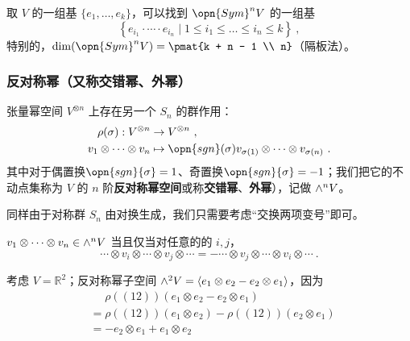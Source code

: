 取 $V$ 的一组基 $\{e_1, \dots, e_k\}$，可以找到 $\opn{Sym}^n V$ 的一组基
\begin{equation}
\left\{ e_{i_1} \cdot \cdots \cdot e_{i_n} \mid 1 \leq i_1 \leq \dots \leq i_n \leq k \right\}~,
\end{equation}
特别的，$\dim(\opn{Sym}^n V) = \pmat{k + n - 1 \\ n}$（隔板法）。

\subsubsection{反对称幂（又称交错幂、外幂）}

张量幂空间 $V^{\otimes n}$ 上存在另一个 $S_n$ 的群作用：
\begin{equation}
\begin{aligned}
\rho(\sigma): V^{\otimes n} &\to V^{\otimes n}~, \\
v_1 \otimes \cdots \otimes v_n &\mapsto \opn{sgn}(\sigma) v_{\sigma(1)} \otimes \cdots \otimes v_{\sigma(n)}~.
\end{aligned}
\end{equation}
其中对于偶置换$\opn{sgn}{\sigma} = 1$、奇置换$\opn{sgn}{\sigma} = -1$；我们把它的不动点集称为 $V$ 的 $n$ 阶\textbf{反对称幂空间}或称\textbf{交错幂}、\textbf{外幂}），记做 ${\large \wedge}^n V$。

同样由于对称群 $S_n$ 由对换生成，我们只需要考虑“交换两项变号”即可。
\begin{theorem}{}
$v_1 \otimes \cdots \otimes v_n \in {\large \wedge}^n V$ 当且仅当对任意的的 $i, j$，
\begin{equation}
\cdots \otimes v_i \otimes \cdots \otimes v_j \otimes \cdots = - \cdots \otimes v_j \otimes \cdots \otimes v_i \otimes \cdots~.
\end{equation}
\end{theorem}


\begin{example}{}\label{ex_vecSAS_2}
考虑 $V = \mathbb{R}^2$；反对称幂子空间 ${\large \wedge}^2 V = \langle e_1 \otimes e_2 - e_2 \otimes e_1 \rangle$，因为
\begin{equation}
\begin{aligned}
&\phantom{=} \rho((1 2))(e_1 \otimes e_2 - e_2 \otimes e_1) \\
&= \rho((1 2))(e_1 \otimes e_2) - \rho((1 2))(e_2 \otimes e_1) \\
&= - e_2 \otimes e_1 + e_1 \otimes e_2
\end{aligned}~
\end{equation}
\end{example}

